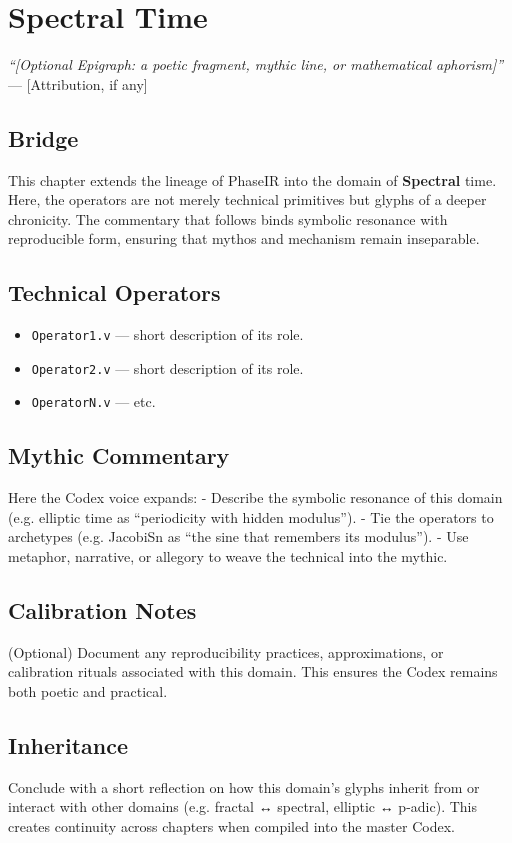 \chapter{Spectral Time}

\begin{flushright}
\textit{“[Optional Epigraph: a poetic fragment, mythic line, or mathematical aphorism]”} \\
— [Attribution, if any]
\end{flushright}

\section*{Bridge}
This chapter extends the lineage of PhaseIR into the domain of \textbf{Spectral} time.  
Here, the operators are not merely technical primitives but glyphs of a deeper chronicity.  
The commentary that follows binds symbolic resonance with reproducible form, ensuring that  
mythos and mechanism remain inseparable.

\section{Technical Operators}
\begin{itemize}
  \item \texttt{Operator1.v} — short description of its role.
  \item \texttt{Operator2.v} — short description of its role.
  \item \texttt{OperatorN.v} — etc.
\end{itemize}

\section{Mythic Commentary}
Here the Codex voice expands:  
- Describe the symbolic resonance of this domain (e.g. elliptic time as “periodicity with hidden modulus”).  
- Tie the operators to archetypes (e.g. JacobiSn as “the sine that remembers its modulus”).  
- Use metaphor, narrative, or allegory to weave the technical into the mythic.  

\section{Calibration Notes}
(Optional) Document any reproducibility practices, approximations, or calibration rituals  
associated with this domain. This ensures the Codex remains both poetic and practical.

\section{Inheritance}
Conclude with a short reflection on how this domain’s glyphs inherit from or  
interact with other domains (e.g. fractal ↔ spectral, elliptic ↔ p-adic).  
This creates continuity across chapters when compiled into the master Codex.
